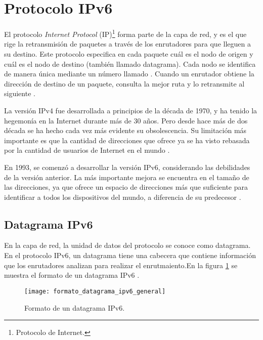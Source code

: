\section{Protocolo IPv6}

\label{sec:protocolo_ipv6}

El protocolo \textit{Internet Protocol} (IP)\footnote{Protocolo de Internet.}
forma parte de la capa de red, y es el que rige la retransmisión de paquetes
a través de los enrutadores para que lleguen a su destino. Este protocolo
especifica en cada paquete cuál es el nodo de origen y cuál es el nodo de
destino (también llamado datagrama). Cada nodo se identifica de manera única
mediante un número llamado . Cuando un enrutador obtiene
la dirección de destino de un paquete, consulta la mejor ruta y lo retransmite
al siguiente \cite{Kurose2013}.

La versión IPv4 fue desarrollada a principios de la década de 1970, y ha tenido
la hegemonía en la Internet durante más de 30 años. Pero desde hace más de dos
década se ha hecho cada vez más evidente su obsolescencia. Su limitación más
importante es que la cantidad de direcciones que ofrece ya se ha visto rebasada
por la cantidad de usuarios de Internet en el mundo \cite{Hagen2006}.

En 1993, se comenzó a desarrollar la versión IPv6, considerando las debilidades
de la versión anterior. La más importante mejora se encuentra en el tamaño de
las direcciones, ya que ofrece un espacio de direcciones más que suficiente
para identificar a todos los dispositivos del mundo, a diferencia de su
predecesor \cite{Hagen2006}.

\subsection{Datagrama IPv6}

\label{subsec:datagrama_ipv6}

En la capa de red, la unidad de datos del protocolo se conoce como datagrama.
En el protocolo IPv6, un datagrama tiene una cabecera que contiene información
que los enrutadores analizan para realizar el enrutmaiento.En la figura
\ref{fig:formato_datagrama_ipv6_general} se muestra el formato de un datagrama
IPv6 \cite{Hagen2006}.

\begin{figure}[th]
\centering
\texttt{[image: formato\_datagrama\_ipv6\_general]}
\decoRule
\caption[Datagrama IPv6]{Formato de un datagrama IPv6.}
\label{fig:formato_datagrama_ipv6_general}
\end{figure}

